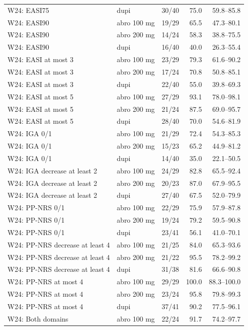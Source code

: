 \begin{longtable}{llrrr}
W24: EASI75 & dupi & 30/40 & 75.0 & 59.8--85.8 \\
W24: EASI90 & abro 100 mg & 19/29 & 65.5 & 47.3--80.1 \\
W24: EASI90 & abro 200 mg & 14/24 & 58.3 & 38.8--75.5 \\
W24: EASI90 & dupi & 16/40 & 40.0 & 26.3--55.4 \\
W24: EASI at most 3 & abro 100 mg & 23/29 & 79.3 & 61.6--90.2 \\
W24: EASI at most 3 & abro 200 mg & 17/24 & 70.8 & 50.8--85.1 \\
W24: EASI at most 3 & dupi & 22/40 & 55.0 & 39.8--69.3 \\
W24: EASI at most 5 & abro 100 mg & 27/29 & 93.1 & 78.0--98.1 \\
W24: EASI at most 5 & abro 200 mg & 21/24 & 87.5 & 69.0--95.7 \\
W24: EASI at most 5 & dupi & 28/40 & 70.0 & 54.6--81.9 \\
W24: IGA 0/1 & abro 100 mg & 21/29 & 72.4 & 54.3--85.3 \\
W24: IGA 0/1 & abro 200 mg & 15/23 & 65.2 & 44.9--81.2 \\
W24: IGA 0/1 & dupi & 14/40 & 35.0 & 22.1--50.5 \\
W24: IGA decrease at least 2 & abro 100 mg & 24/29 & 82.8 & 65.5--92.4 \\
W24: IGA decrease at least 2 & abro 200 mg & 20/23 & 87.0 & 67.9--95.5 \\
W24: IGA decrease at least 2 & dupi & 27/40 & 67.5 & 52.0--79.9 \\
W24: PP-NRS 0/1 & abro 100 mg & 22/29 & 75.9 & 57.9--87.8 \\
W24: PP-NRS 0/1 & abro 200 mg & 19/24 & 79.2 & 59.5--90.8 \\
W24: PP-NRS 0/1 & dupi & 23/41 & 56.1 & 41.0--70.1 \\
W24: PP-NRS decrease at least 4 & abro 100 mg & 21/25 & 84.0 & 65.3--93.6 \\
W24: PP-NRS decrease at least 4 & abro 200 mg & 21/22 & 95.5 & 78.2--99.2 \\
W24: PP-NRS decrease at least 4 & dupi & 31/38 & 81.6 & 66.6--90.8 \\
W24: PP-NRS at most 4 & abro 100 mg & 29/29 & 100.0 & 88.3--100.0 \\
W24: PP-NRS at most 4 & abro 200 mg & 23/24 & 95.8 & 79.8--99.3 \\
W24: PP-NRS at most 4 & dupi & 37/41 & 90.2 & 77.5--96.1 \\
W24: Both domains & abro 100 mg & 22/24 & 91.7 & 74.2--97.7 \\

\end{longtable}
